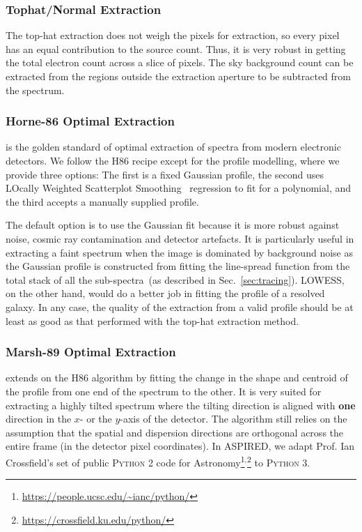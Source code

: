 \documentclass[linenumbers, twocolumn]{aastex631}
\begin{document}
\subsubsection*{Tophat/Normal Extraction}
\label{sec:tophat}
The top-hat extraction does not weigh the pixels for extraction,
so every pixel has an equal contribution to the source count. Thus,
it is very robust in getting the total electron count across
a slice of pixels. The sky background count can be extracted
from the regions outside the extraction aperture to be
subtracted from the spectrum.

\subsubsection*{Horne-86 Optimal Extraction}
\citet[hereafter H86]{1986PASP...98..609H} is the golden standard
of optimal extraction of spectra from modern electronic detectors.
We follow the H86 recipe except for the profile modelling,
where we provide three options: The first is a fixed Gaussian
profile, the second uses LOcally Weighted Scatterplot
Smoothing~\citep[LOWESS]{doi:10.1080/01621459.1979.10481038}
regression to fit for a polynomial, and the third accepts
a manually supplied profile.

The default option is to use the Gaussian fit because it is
more robust against noise, cosmic ray contamination and detector
artefacts. It is particularly useful in extracting a faint
spectrum when the image is dominated by background noise as the
Gaussian profile is constructed from fitting the line-spread
function from the total stack of all the
sub-spectra~(as described in Sec.~\ref{sec:tracing}).
LOWESS, on the other hand, would do a better job in fitting
the profile of a resolved galaxy. In any case, the quality
of the extraction from a valid profile should be at least as
good as that performed with the top-hat extraction method.

\subsubsection*{Marsh-89 Optimal Extraction}
\citet[hereafter M89]{1989PASP..101.1032M} extends on the H86 algorithm by
fitting the change in the shape and centroid of the profile from one end of the
spectrum to the other. It is very suited for extracting a highly tilted
spectrum where the tilting direction is aligned with \textbf{one} direction in
the $x$- or the $y$-axis of the detector. The algorithm still relies on the
assumption that the spatial and dispersion directions are orthogonal across
the entire frame (in the detector pixel coordinates). In \textsc{ASPIRED}, we
adapt Prof. Ian Crossfield's set of public \textsc{Python 2} code for
Astronomy\footnote{\url{https://people.ucsc.edu/~ianc/python/}}$^,$\footnote{\url{https://crossfield.ku.edu/python/}}
to \textsc{Python 3}.
\end{document}
